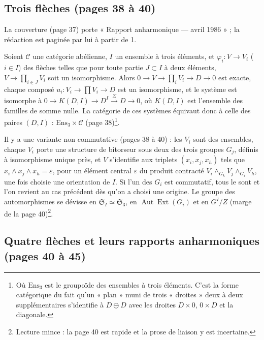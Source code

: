 \documentclass[11pt,a4paper]{article}
\begin{document}
\subsection*{Trois flèches (pages 38 à 40)}

La couverture (page 37) porte « Rapport anharmonique — avril 1986 » ; la
rédaction est paginée par lui à partir de 1.

Soient $\mathcal{C}$ une catégorie abélienne, $I$ un ensemble à trois
éléments, et $\varphi_i : V \to V_i$ ($i \in I$) des flèches telles que pour
toute partie $J \subset I$ à deux éléments, $V \to \prod_{i \in J} V_i$ soit un
isomorphisme. Alors $0 \to V \to \prod_i V_i \to D \to 0$ est exacte, chaque
composé $u_i : V_i \to \prod V_i \to D$ est un isomorphisme, et le système est
isomorphe à $0 \to K(D, I) \to D^I \xrightarrow{\Sigma} D \to 0$, où $K(D, I)$
est l'ensemble des familles de somme nulle. La catégorie de ces systèmes
équivaut donc à celle des paires $(D, I)$ : $\mathrm{Ens}_3 \times \mathcal{C}$
(page 38)\footnote{Où $\mathrm{Ens}_3$ est le groupoïde des ensembles à trois
éléments. C'est la forme catégorique du fait qu'un « plan » muni de trois
« droites » deux à deux supplémentaires s'identifie à $D \oplus D$ avec les
droites $D \times 0$, $0 \times D$ et la diagonale.}.

Il y a une variante non commutative (pages 38 à 40) : les $V_i$ sont des
ensembles, chaque $V_i$ porte une structure de bitorseur sous deux des trois
groupes $G_j$, définis à isomorphisme unique près, et $V$ s'identifie aux
triplets $(x_i, x_j, x_h)$ tels que $x_i \wedge x_j \wedge x_h = \varepsilon$,
pour un élément central $\varepsilon$ du produit contracté $V_i
\wedge_{G_k} V_j \wedge_{G_i} V_h$, une fois choisie une orientation de $I$.
Si l'un des $G_i$ est commutatif, tous le sont et l'on revient au cas
précédent dès qu'on a choisi une origine. Le groupe des automorphismes se
dévisse en $\mathfrak{S}_I \simeq \mathfrak{S}_3$, en
$\operatorname{Aut}\operatorname{Ext}(G_i)$ et en $G^I/Z$ (marge de la page
40)\footnote{Lecture mince : la page 40 est rapide et la prose de liaison y est
incertaine.}.

\subsection*{Quatre flèches et leurs rapports anharmoniques (pages 40 à 45)}
\end{document}

